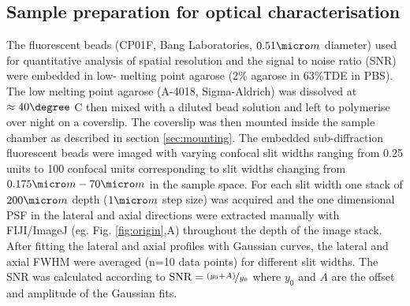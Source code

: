 \documentclass[12pt]{spieman}  %
\begin{document}
\subsection{Sample preparation for optical characterisation}
The fluorescent beads (CP01F, Bang Laboratories, $0.51 \micro m$ diameter) used for quantitative analysis of spatial resolution and the signal to noise ratio (SNR) were embedded in low- melting point agarose (2\% agarose in 63\%TDE in PBS). The low melting point agarose (A-4018, Sigma-Aldrich) was dissolved at $\approx 40 \degree$ C then mixed with a diluted bead solution and left to polymerise over night on a coverslip. The coverslip was then mounted inside the sample chamber as described in section \ref{sec:mounting}. The embedded sub-diffraction fluorescent beads were imaged with varying confocal slit widths ranging from 0.25 units to 100 confocal units corresponding to slit widths changing from $0.175 \micro m-70 \micro m$ in the sample space. For each slit width one stack of $200\micro m$ depth ($1 \micro m$ step size) was acquired and the one dimensional PSF in the lateral and axial directions were extracted manually with FIJI/ImageJ (eg. Fig. \ref{fig:origin},A) throughout the depth of the image stack. After fitting the lateral and axial profiles with Gaussian curves, the lateral and axial FWHM were averaged (n=10 data points) for different slit widths. The SNR was calculated according to $\text{SNR} = \nicefrac{(y_0 + A)}{y_0}$ where $y_0$ and $A$ are the offset and amplitude of the Gaussian fits.
\end{document}
